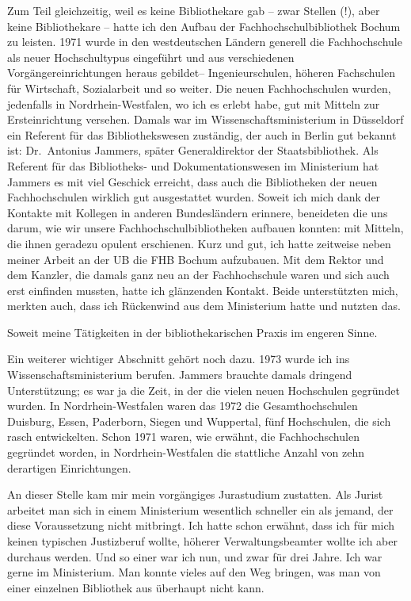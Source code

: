\documentclass[a4paper,
fontsize=11pt,
oneside,
numbers=noperiodatend,
parskip=half-,
bibliography=totoc,
final
]{scrartcl}
\begin{document}
Zum Teil gleichzeitig, weil es keine Bibliothekare gab -- zwar Stellen
(!), aber keine Bibliothekare -- hatte ich den Aufbau der
Fachhochschulbibliothek Bochum zu leisten. 1971 wurde in den
westdeutschen Ländern generell die Fachhochschule als neuer
Hochschultypus eingeführt und aus verschiedenen Vorgängereinrichtungen
heraus gebildet-- Ingenieurschulen, höheren Fachschulen für Wirtschaft,
Sozialarbeit und so weiter. Die neuen Fachhochschulen wurden, jedenfalls
in Nordrhein-Westfalen, wo ich es erlebt habe, gut mit Mitteln zur
Ersteinrichtung versehen. Damals war im Wissenschaftsministerium in
Düsseldorf ein Referent für das Bibliothekswesen zuständig, der auch in
Berlin gut bekannt ist: Dr.~Antonius Jammers, später Generaldirektor der
Staatsbibliothek. Als Referent für das Bibliotheks- und
Dokumentationswesen im Ministerium hat Jammers es mit viel Geschick
erreicht, dass auch die Bibliotheken der neuen Fachhochschulen wirklich
gut ausgestattet wurden. Soweit ich mich dank der Kontakte mit Kollegen
in anderen Bundesländern erinnere, beneideten die uns darum, wie wir
unsere Fachhochschulbibliotheken aufbauen konnten: mit Mitteln, die
ihnen geradezu opulent erschienen. Kurz und gut, ich hatte zeitweise
neben meiner Arbeit an der UB die FHB Bochum aufzubauen. Mit dem Rektor
und dem Kanzler, die damals ganz neu an der Fachhochschule waren und
sich auch erst einfinden mussten, hatte ich glänzenden Kontakt. Beide
unterstützten mich, merkten auch, dass ich Rückenwind aus dem
Ministerium hatte und nutzten das.

Soweit meine Tätigkeiten in der bibliothekarischen Praxis im engeren
Sinne.

Ein weiterer wichtiger Abschnitt gehört noch dazu. 1973 wurde ich ins
Wissenschaftsministerium berufen. Jammers brauchte damals dringend
Unterstützung; es war ja die Zeit, in der die vielen neuen Hochschulen
gegründet wurden. In Nordrhein-Westfalen waren das 1972 die
Gesamthochschulen Duisburg, Essen, Paderborn, Siegen und Wuppertal, fünf
Hochschulen, die sich rasch entwickelten. Schon 1971 waren, wie erwähnt,
die Fachhochschulen gegründet worden, in Nordrhein-Westfalen die
stattliche Anzahl von zehn derartigen Einrichtungen.

An dieser Stelle kam mir mein vorgängiges Jurastudium zustatten. Als
Jurist arbeitet man sich in einem Ministerium wesentlich schneller ein
als jemand, der diese Voraussetzung nicht mitbringt. Ich hatte schon
erwähnt, dass ich für mich keinen typischen Justizberuf wollte, höherer
Verwaltungsbeamter wollte ich aber durchaus werden. Und so einer war ich
nun, und zwar für drei Jahre. Ich war gerne im Ministerium. Man konnte
vieles auf den Weg bringen, was man von einer einzelnen Bibliothek aus
überhaupt nicht kann.
\end{document}
